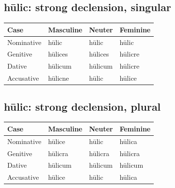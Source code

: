 \subsection*{hūlic: strong declension, singular}

\par\begingroup
\fontsize{10.5}{13.2}\selectfont
\setlength{\LTleft}{0pt}\setlength{\LTright}{\fill}
\noindent
\begin{tabular}{@{}>{\raggedright\arraybackslash}p{28.89mm}>{\raggedright\arraybackslash}p{28.89mm}>{\raggedright\arraybackslash}p{28.89mm}>{\raggedright\arraybackslash}p{28.89mm}@{}}
\toprule
\textbf{Case} & \textbf{Masculine} & \textbf{Neuter} & \textbf{Feminine} \\
\midrule
Nominative & hūlic & hūlic & hūlic \\
Genitive & hūlices & hūlices & hūlicre \\
Dative & hūlicum & hūlicum & hūlicre \\
Accusative & hūlicne & hūlic & hūlice \\
\bottomrule
\end{tabular}
\par\endgroup

\subsection*{hūlic: strong declension, plural}

\par\begingroup
\fontsize{10.5}{13.2}\selectfont
\setlength{\LTleft}{0pt}\setlength{\LTright}{\fill}
\noindent
\begin{tabular}{@{}>{\raggedright\arraybackslash}p{28.89mm}>{\raggedright\arraybackslash}p{28.89mm}>{\raggedright\arraybackslash}p{28.89mm}>{\raggedright\arraybackslash}p{28.89mm}@{}}
\toprule
\textbf{Case} & \textbf{Masculine} & \textbf{Neuter} & \textbf{Feminine} \\
\midrule
Nominative & hūlice & hūlic & hūlica \\
Genitive & hūlicra & hūlicra & hūlicra \\
Dative & hūlicum & hūlicum & hūlicum \\
Accusative & hūlice & hūlic & hūlica \\
\bottomrule
\end{tabular}
\par\endgroup

